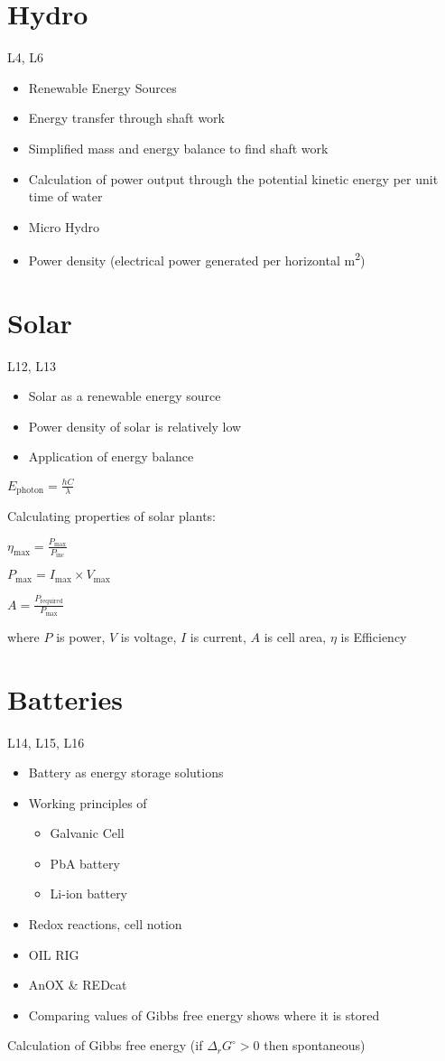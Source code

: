 \documentclass[a4paper, 12pt]{article}
\begin{document}
\section*{Hydro}
L4, L6
\begin{itemize}
  \item Renewable Energy Sources
  \item Energy transfer through shaft work
  \item Simplified mass and energy balance to find shaft work 
  \item Calculation of power output through the potential kinetic energy per unit time of water 
  \item Micro Hydro
  \item Power density (electrical power generated per horizontal m\textsuperscript{2})
\end{itemize}

\section*{Solar}
L12, L13
\begin{itemize}
  \item Solar as a renewable energy source
  \item Power density of solar is relatively low
  \item Application of energy balance 
\end{itemize}

$E_{\text{photon}} = \frac{hC}{\lambda}$

Calculating properties of solar plants:

$\eta_{\text{max}} = \frac{P_\text{max}}{P_\text{inc}}$

$P_\text{max} = I_\text{max} \times V_\text{max}$

$A = \frac{P_\text{required}}{P_\text{max}}$

{\scriptsize where $P$ is power, $V$ is voltage, $I$ is current, $A$ is cell area, $\eta$ is Efficiency \/}

\newpage
\section*{Batteries}
L14, L15, L16
\begin{itemize}
  \item Battery as energy storage solutions
  \item Working principles of
  \begin{itemize}
    \item Galvanic Cell
    \item PbA battery 
    \item Li-ion battery 
  \end{itemize}
  \item Redox reactions, cell notion
  \item OIL RIG
  \item AnOX \& REDcat
  \item Comparing values of Gibbs free energy shows where it is stored
\end{itemize}
Calculation of Gibbs free energy (if $\Delta_r G^\circ > 0$ then spontaneous)
\end{document}
